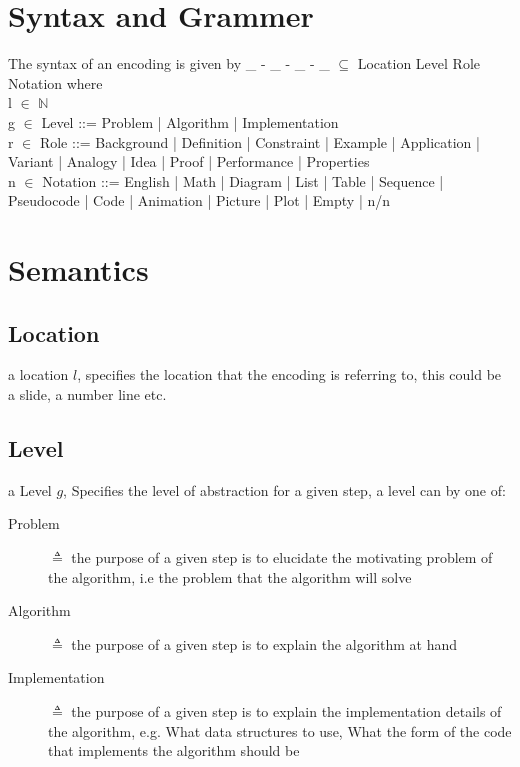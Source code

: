 \documentclass[10pt, letterpaper]{article}
\begin{document}
\section*{Syntax  and Grammer}
\label{sec:orgf59d647}
The syntax of an encoding is given by \_ - \_ - \_ - \_ \(\subseteq\) Location \texttimes{} Level \texttimes{} Role \texttimes{} Notation where \\

l \(\in\) \(\mathbb{N}\) \\

g \(\in\) Level ::= Problem | Algorithm | Implementation \\

r \(\in\) Role ::= Background | Definition | Constraint | Example | Application | Variant | Analogy | Idea | Proof | Performance | Properties \\

n \(\in\) Notation ::= English | Math | Diagram | List | Table | Sequence | Pseudocode | Code | Animation | Picture | Plot | Empty | n/n 
\section*{Semantics}
\label{sec:org33ae1f5}
\subsection*{Location}
\label{sec:orgbbb552c}
a location \(l\), specifies the location that the encoding is referring to,
this could be a slide, a number line etc.
\subsection*{Level}
\label{sec:org125fee4}
a Level \(g\), Specifies the level of abstraction for a given step, a level can by one of:
\begin{description}
\item[{Problem}] \(\triangleq\) the purpose of a given step is to elucidate the
motivating problem of the algorithm, i.e the problem that the algorithm
will solve
\item[{Algorithm}] \(\triangleq\) the purpose of a given step is to explain the
algorithm at hand
\item[{Implementation}] \(\triangleq\) the purpose of a given step is to explain the
implementation details of the algorithm, e.g. What data structures to
use, What the form of the code that implements the algorithm should be
\end{description}
\end{document}
